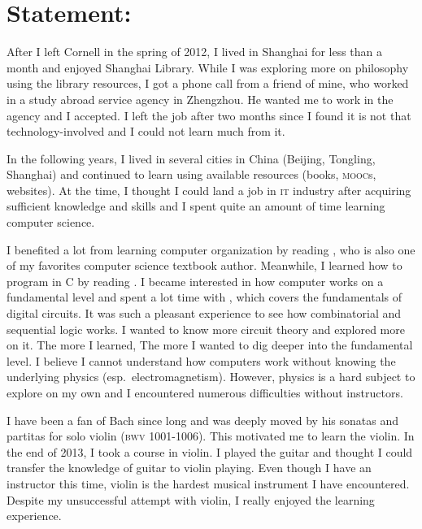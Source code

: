 


\usepackage[font={scriptsize,it}]{caption}
\usepackage{metalogo,alltt,soul,tikz,standalone,wrapfig,csquotes}
\usetikzlibrary{calc}
\usepackage{biblatex}



\newcommand*{\TikZ}{PGF/\kern1bpTi\kern.5bp\textit{k}Z}


	\onum
	
	\section*{Statement:}
	After I left Cornell in the spring of 2012, I lived in Shanghai for less
	than a month and enjoyed Shanghai Library. While I was exploring more on
	philosophy using the library resources, I got a phone call from a friend of
	mine, who worked in a study abroad service agency in Zhengzhou. He wanted me to
	work in the agency and I accepted. I left the job after two months since I
	found it is not that technology-involved and I could not learn much from it.
	
	In the following years, I lived in several cities in China (Beijing, Tongling,
	Shanghai) and continued to learn using available resources (books, \textsc{mooc}s,
	websites). At the time, I thought I could land a job in \textsc{it} industry after
	acquiring sufficient knowledge and skills and I spent quite an amount of time
	learning computer science.
	
	I benefited a lot from learning computer organization by reading
	\textcite{COA8e}, who is also one of my favorites computer science textbook
	author. Meanwhile, I learned how to program in C by reading \textcite{K&R}. I
	became interested in how computer works on a fundamental level and spent a lot
	time with \textcite{LCDF}, which covers the fundamentals of digital circuits.
	It was such a pleasant experience to see how combinatorial and sequential logic
	works. I wanted to know more circuit theory and explored more on it. The more I
	learned, The more I wanted to dig deeper into the fundamental level. I believe
	I cannot understand how computers work without knowing the underlying physics
	(esp.~electromagnetism). However, physics is a hard subject to explore on my
	own and I encountered numerous difficulties without instructors.
	
	I have been a fan of Bach since long and was deeply moved by his sonatas and
	partitas for solo violin (\textsc{bwv} 1001-1006). This motivated me to
	learn the violin. In the end of 2013, I took a course in violin. I
	played the guitar and thought I could transfer the knowledge of guitar to
	violin playing. Even though I have an instructor this time, violin is the
	hardest musical instrument I have encountered. Despite my unsuccessful attempt
	with violin, I really enjoyed the learning experience.
	
